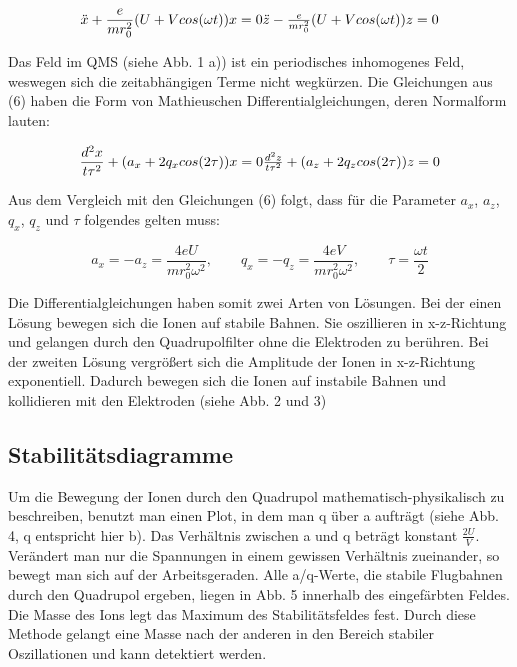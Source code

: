 \begin{equation}
\ddot{x} + \frac{e}{mr_{0}^{2}}(U+V cos (\omega t)) x = 0
$$\\$$
\ddot{z} - \frac{e}{mr_{0}^{2}}(U+V cos (\omega t)) z = 0
\end{equation}

Das Feld im QMS (siehe Abb. 1 a)) ist ein periodisches inhomogenes Feld, weswegen sich die zeitabhängigen Terme nicht wegkürzen. Die Gleichungen aus (6) haben die Form von Mathieuschen Differentialgleichungen, deren Normalform lauten:

\begin{equation}
\frac{d^{2}x}{t\tau^{2}}+(a_{x}+2q_{x}cos (2\tau)) x = 0
$$\\$$
\frac{d^{2}z}{t\tau^{2}}+(a_{z}+2q_{z}cos (2\tau)) z = 0
\end{equation}

Aus dem Vergleich mit den Gleichungen (6) folgt, dass für die Parameter $a_{x}$, $a_{z}$, $q_{x}$, $q_{z}$ und $\tau$ folgendes gelten muss:

\begin{equation}
a_{x} = -a_{z} = \frac{4eU}{mr_{0}^{2}\omega^{2}},\qquad q_{x}= -q_{z}= \frac{4eV}{mr_{0}^{2}\omega^{2}},\qquad \tau =\frac{\omega t}{2}
\end{equation}

Die Differentialgleichungen haben somit zwei Arten von Lösungen. Bei der einen Lösung bewegen sich die Ionen auf stabile Bahnen. Sie oszillieren in x-z-Richtung und gelangen durch den Quadrupolfilter ohne die Elektroden zu berühren. Bei der zweiten Lösung vergrößert sich die Amplitude der Ionen in x-z-Richtung exponentiell. Dadurch bewegen sich die Ionen auf instabile Bahnen und kollidieren mit den Elektroden (siehe Abb. 2 und 3)



\subsection{Stabilitätsdiagramme}
Um die Bewegung der Ionen durch den Quadrupol mathematisch-physikalisch zu beschreiben, benutzt man einen Plot, in dem man q über a aufträgt (siehe Abb. 4, q entspricht hier b). Das Verhältnis zwischen a und q beträgt konstant $\frac{2U}{V}$. Verändert man nur die Spannungen in einem gewissen Verhältnis zueinander, so bewegt man sich auf der Arbeitsgeraden. Alle a/q-Werte, die stabile Flugbahnen durch den Quadrupol ergeben, liegen in Abb. 5 innerhalb des eingefärbten Feldes. Die Masse des Ions legt das Maximum des Stabilitätsfeldes fest. Durch diese Methode gelangt eine Masse nach der anderen in den Bereich stabiler Oszillationen und kann detektiert werden.

